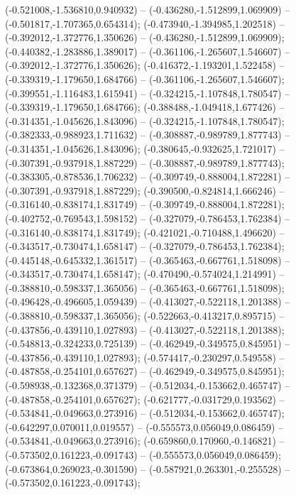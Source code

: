  (-0.521008,-1.536810,0.940932) -- (-0.436280,-1.512899,1.069909) -- (-0.501817,-1.707365,0.654314);
 (-0.473940,-1.394985,1.202518) -- (-0.392012,-1.372776,1.350626) -- (-0.436280,-1.512899,1.069909);
 (-0.440382,-1.283886,1.389017) -- (-0.361106,-1.265607,1.546607) -- (-0.392012,-1.372776,1.350626);
 (-0.416372,-1.193201,1.522458) -- (-0.339319,-1.179650,1.684766) -- (-0.361106,-1.265607,1.546607);
 (-0.399551,-1.116483,1.615941) -- (-0.324215,-1.107848,1.780547) -- (-0.339319,-1.179650,1.684766);
 (-0.388488,-1.049418,1.677426) -- (-0.314351,-1.045626,1.843096) -- (-0.324215,-1.107848,1.780547);
 (-0.382333,-0.988923,1.711632) -- (-0.308887,-0.989789,1.877743) -- (-0.314351,-1.045626,1.843096);
 (-0.380645,-0.932625,1.721017) -- (-0.307391,-0.937918,1.887229) -- (-0.308887,-0.989789,1.877743);
 (-0.383305,-0.878536,1.706232) -- (-0.309749,-0.888004,1.872281) -- (-0.307391,-0.937918,1.887229);
 (-0.390500,-0.824814,1.666246) -- (-0.316140,-0.838174,1.831749) -- (-0.309749,-0.888004,1.872281);
 (-0.402752,-0.769543,1.598152) -- (-0.327079,-0.786453,1.762384) -- (-0.316140,-0.838174,1.831749);
 (-0.421021,-0.710488,1.496620) -- (-0.343517,-0.730474,1.658147) -- (-0.327079,-0.786453,1.762384);
 (-0.445148,-0.645332,1.361517) -- (-0.365463,-0.667761,1.518098) -- (-0.343517,-0.730474,1.658147);
 (-0.470490,-0.574024,1.214991) -- (-0.388810,-0.598337,1.365056) -- (-0.365463,-0.667761,1.518098);
 (-0.496428,-0.496605,1.059439) -- (-0.413027,-0.522118,1.201388) -- (-0.388810,-0.598337,1.365056);
 (-0.522663,-0.413217,0.895715) -- (-0.437856,-0.439110,1.027893) -- (-0.413027,-0.522118,1.201388);
 (-0.548813,-0.324233,0.725139) -- (-0.462949,-0.349575,0.845951) -- (-0.437856,-0.439110,1.027893);
 (-0.574417,-0.230297,0.549558) -- (-0.487858,-0.254101,0.657627) -- (-0.462949,-0.349575,0.845951);
 (-0.598938,-0.132368,0.371379) -- (-0.512034,-0.153662,0.465747) -- (-0.487858,-0.254101,0.657627);
 (-0.621777,-0.031729,0.193562) -- (-0.534841,-0.049663,0.273916) -- (-0.512034,-0.153662,0.465747);
 (-0.642297,0.070011,0.019557) -- (-0.555573,0.056049,0.086459) -- (-0.534841,-0.049663,0.273916);
 (-0.659860,0.170960,-0.146821) -- (-0.573502,0.161223,-0.091743) -- (-0.555573,0.056049,0.086459);
 (-0.673864,0.269023,-0.301590) -- (-0.587921,0.263301,-0.255528) -- (-0.573502,0.161223,-0.091743);
